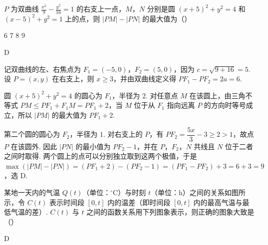 \begin{problem}
\(P\) 为双曲线 \(\frac{x^2}{9} -\frac{y^2}{16} = 1\) 的右支上一点，\(M\)，\(N\) 分别是圆 \((x + 5)^2 +y^2 = 4\) 和 \((x - 5)^2 +y^2 = 1\) 上的点，则 \(|PM| - |PN|\) 的最大值为（\quad）

\choices
    {\(6\)}
    {\(7\)}
    {\(8\)}
    {\(9\)}
\end{problem}

\begin{answer}
D
\end{answer}

\begin{solution}
记双曲线的左、右焦点为 \(F_1=(-5,0)\)，\(F_2=(5,0)\)，因为 \(c=\sqrt{9+16}=5\). 设 \(P=(x,y)\) 在右支上，则 \(x\geqslant3\)，并由双曲线定义得 \(PF_1-PF_2=2a=6\).

圆 \((x+5)^2+y^2=4\) 的圆心为 \(F_1\)，半径为 \(2\). 对任意点 \(M\) 在该圆上，由三角不等式 \(PM\leqslant PF_1+F_1M=PF_1+2\)，当 \(M\) 位于从 \(F_1\) 指向远离 \(P\) 的方向时等号成立，所以 \(|PM|\) 的最大值为 \(PF_1+2\).

第二个圆的圆心为 \(F_2\)，半径为 \(1\). 对右支上的 \(P\)，有 \(PF_2=\dfrac{5x}{3}-3\geqslant2>1\)，故点 \(P\) 在该圆外. 因此 \(|PN|\) 的最小值为 \(PF_2-1\)，并在 \(P\)，\(F_2\)，\(N\) 共线且 \(N\) 位于二者之间时取得. 两个圆上的点可以分别独立取到这两个极值，于是 \(\max(|PM|-|PN|)=(PF_1+2)-(PF_2-1)=(PF_1-PF_2)+3=6+3=9\)，选 D.
\end{solution}

\begin{problem}
某地一天内的气温 \(Q(t)\)（单位：\(^{\circ}\mathrm{C}\)）与时刻 \(t\)（单位：\(\mathrm{h}\)）之间的关系如图所示，令 \(C(t)\) 表示时间段 \([0, t]\) 内的温差（即时间段 \([0, t]\) 内的最高气温与最低气温的差）. \(C(t)\) 与 \(t\) 之间的函数关系用下列图象表示，则正确的图象大致是（\quad）


    {}
    {}
    {}
\end{problem}

\begin{answer}
D
\end{answer}


